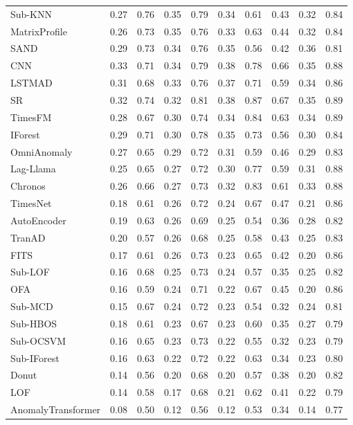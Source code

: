 \begin{table}
{\begin{tabular}{l|c|c|c|c|c|c|c|c|c}
Sub-KNN & 0.27 & 0.76 & 0.35 & 0.79 & 0.34 & 0.61 & 0.43 & 0.32 & 0.84 \\
MatrixProfile & 0.26 & 0.73 & 0.35 & 0.76 & 0.33 & 0.63 & 0.44 & 0.32 & 0.84 \\
SAND & 0.29 & 0.73 & 0.34 & 0.76 & 0.35 & 0.56 & 0.42 & 0.36 & 0.81 \\
CNN & 0.33 & 0.71 & 0.34 & 0.79 & 0.38 & 0.78 & 0.66 & 0.35 & 0.88 \\
LSTMAD & 0.31 & 0.68 & 0.33 & 0.76 & 0.37 & 0.71 & 0.59 & 0.34 & 0.86 \\
SR & 0.32 & 0.74 & 0.32 & 0.81 & 0.38 & 0.87 & 0.67 & 0.35 & 0.89 \\
TimesFM & 0.28 & 0.67 & 0.30 & 0.74 & 0.34 & 0.84 & 0.63 & 0.34 & 0.89 \\
IForest & 0.29 & 0.71 & 0.30 & 0.78 & 0.35 & 0.73 & 0.56 & 0.30 & 0.84 \\
OmniAnomaly & 0.27 & 0.65 & 0.29 & 0.72 & 0.31 & 0.59 & 0.46 & 0.29 & 0.83 \\
Lag-Llama & 0.25 & 0.65 & 0.27 & 0.72 & 0.30 & 0.77 & 0.59 & 0.31 & 0.88 \\
Chronos & 0.26 & 0.66 & 0.27 & 0.73 & 0.32 & 0.83 & 0.61 & 0.33 & 0.88 \\
TimesNet & 0.18 & 0.61 & 0.26 & 0.72 & 0.24 & 0.67 & 0.47 & 0.21 & 0.86 \\
AutoEncoder & 0.19 & 0.63 & 0.26 & 0.69 & 0.25 & 0.54 & 0.36 & 0.28 & 0.82 \\
TranAD & 0.20 & 0.57 & 0.26 & 0.68 & 0.25 & 0.58 & 0.43 & 0.25 & 0.83 \\
FITS & 0.17 & 0.61 & 0.26 & 0.73 & 0.23 & 0.65 & 0.42 & 0.20 & 0.86 \\
Sub-LOF & 0.16 & 0.68 & 0.25 & 0.73 & 0.24 & 0.57 & 0.35 & 0.25 & 0.82 \\
OFA & 0.16 & 0.59 & 0.24 & 0.71 & 0.22 & 0.67 & 0.45 & 0.20 & 0.86 \\
Sub-MCD & 0.15 & 0.67 & 0.24 & 0.72 & 0.23 & 0.54 & 0.32 & 0.24 & 0.81 \\
Sub-HBOS & 0.18 & 0.61 & 0.23 & 0.67 & 0.23 & 0.60 & 0.35 & 0.27 & 0.79 \\
Sub-OCSVM & 0.16 & 0.65 & 0.23 & 0.73 & 0.22 & 0.55 & 0.32 & 0.23 & 0.79 \\
Sub-IForest & 0.16 & 0.63 & 0.22 & 0.72 & 0.22 & 0.63 & 0.34 & 0.23 & 0.80 \\
Donut & 0.14 & 0.56 & 0.20 & 0.68 & 0.20 & 0.57 & 0.38 & 0.20 & 0.82 \\
LOF & 0.14 & 0.58 & 0.17 & 0.68 & 0.21 & 0.62 & 0.41 & 0.22 & 0.79 \\
AnomalyTransformer & 0.08 & 0.50 & 0.12 & 0.56 & 0.12 & 0.53 & 0.34 & 0.14 & 0.77 \\
\bottomrule
\end{tabular}
}
\end{table}
